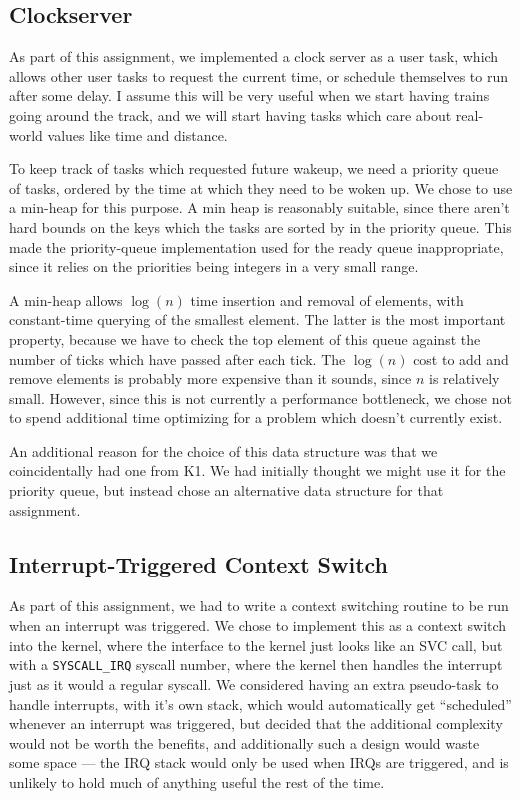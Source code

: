 \documentclass[titlepage]{article}
\begin{document}
\subsection{Clockserver}
As part of this assignment, we implemented a clock server as a user task, which
allows other user tasks to request the current time, or schedule themselves to run
after some delay.
I assume this will be very useful
when we start having trains going around the track, and we will start having
tasks which care about real-world values like time and distance.

To keep track of tasks which requested future wakeup, we need a priority queue
of tasks, ordered by the time at which they need to be woken up.
We chose to use a min-heap for this purpose.
A min heap is reasonably suitable, since there aren't hard bounds on
the keys which the tasks are sorted by in the priority queue.
This made the priority-queue implementation used for the ready queue inappropriate,
since it relies on the priorities being integers in a very small range.

A min-heap allows $\log(n)$ time insertion and removal of elements, with
constant-time querying of the smallest element.
The latter is the most important property, because we have to check the top
element of this queue against the number of ticks which have passed after each tick.
The $\log(n)$ cost to add and remove elements is probably more expensive than it
sounds, since $n$ is relatively small.
However, since this is not currently a performance bottleneck, we chose not to spend
additional time optimizing for a problem which doesn't currently exist.

An additional reason for the choice of this data structure was that we coincidentally
had one from K1.
We had initially thought we might use it for the priority queue,
but instead chose an alternative data structure for that assignment.

\subsection{Interrupt-Triggered Context Switch}
As part of this assignment, we had to write a context switching
routine to be run when an interrupt was triggered.
We chose to implement this as a context switch into the kernel, where the interface to the kernel just looks
like an SVC call, but with a \texttt{SYSCALL\_IRQ} syscall number, where the kernel then
handles the interrupt just as it would a regular syscall. We considered having
an extra pseudo-task to handle interrupts, with it's own stack, which would
automatically get ``scheduled'' whenever an interrupt was triggered, but decided
that the additional complexity would not be worth the benefits, and additionally
such a design would waste some space --- the IRQ stack would only be used when
IRQs are triggered, and is unlikely to hold much of anything useful the rest
of the time.
\end{document}
